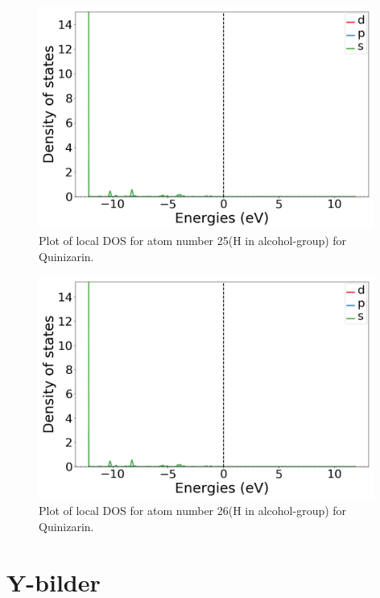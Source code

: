 \documentclass{article}
\begin{document}
  \begin{figure}[H]
      \centering
      \includegraphics[width = 11cm]{../fig/basic_LDOS25_1.png}
      \caption{Plot of local DOS for atom number 25(H in alcohol-group) for Quinizarin.}
      \label{fig:basic_LDOS25_1}
  \end{figure}

  \begin{figure}[H]
      \centering
      \includegraphics[width = 11cm]{../fig/basic_LDOS26_1.png}
      \caption{Plot of local DOS for atom number 26(H in alcohol-group) for Quinizarin. }
      \label{fig:basic_LDOS26_1}
  \end{figure}

\vspace{1cm}

\section{Y-bilder}
\end{document}
